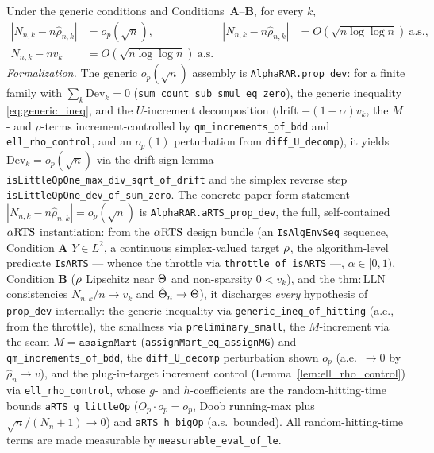 \begin{lemma}\label{lem:prop_dev}
\leanok
{}
Under the generic conditions and Conditions~\textbf{A}--\textbf{B}, for every $k$,
\begin{align*}
  |N_{n,k} - n\hat{\rho}_{n,k}| &= o_p(\sqrt n), &
  |N_{n,k} - n\hat{\rho}_{n,k}| &= O(\sqrt{n\log\log n})\ \text{a.s.}, \\
  N_{n,k} - n v_k &= O(\sqrt{n\log\log n})\ \text{a.s.}
\end{align*}
\emph{Formalization.} The generic $o_p(\sqrt n)$ assembly is \texttt{AlphaRAR.prop\_dev}: for a finite
family with $\sum_k \mathrm{Dev}_k = 0$ (\texttt{sum\_count\_sub\_smul\_eq\_zero}), the generic
inequality \eqref{eq:generic_ineq}, and the $U$-increment decomposition (drift $-(1-\alpha)v_k$, the
$M$- and $\rho$-terms increment-controlled by \texttt{qm\_increments\_of\_bdd} and
\texttt{ell\_rho\_control}, and an $o_p(1)$ perturbation from \texttt{diff\_U\_decomp}), it yields
$\mathrm{Dev}_k=o_p(\sqrt n)$ via the drift-sign lemma
\texttt{isLittleOpOne\_max\_div\_sqrt\_of\_drift} and the simplex reverse step
\texttt{isLittleOpOne\_dev\_of\_sum\_zero}. The concrete paper-form statement
$|N_{n,k}-n\hat\rho_{n,k}|=o_p(\sqrt n)$ is \texttt{AlphaRAR.aRTS\_prop\_dev}, the full, self-contained
$\alpha\text{RTS}$ instantiation: from the $\alpha\text{RTS}$ design bundle (an \texttt{IsAlgEnvSeq} sequence, Condition
\textbf{A} $Y\in L^2$, a continuous simplex-valued target $\rho$, the algorithm-level predicate
\texttt{IsARTS} --- whence the throttle via \texttt{throttle\_of\_isARTS} ---, $\alpha\in[0,1)$,
Condition \textbf{B} ($\rho$ Lipschitz near $\Theta$ and non-sparsity $0<v_k$), and the
$\mathrm{thm{:}LLN}$ consistencies $N_{n,k}/n\to v_k$ and $\hat{\Theta}_n\to\Theta$), it discharges
\emph{every} hypothesis of \texttt{prop\_dev} internally: the generic inequality via
\texttt{generic\_ineq\_of\_hitting} (a.e., from the throttle), the smallness via
\texttt{preliminary\_small}, the $M$-increment via the seam $M=\texttt{assignMart}$
(\texttt{assignMart\_eq\_assignMG}) and \texttt{qm\_increments\_of\_bdd}, the \texttt{diff\_U\_decomp}
perturbation shown $o_p$ (a.e.\ $\to0$ by $\hat\rho_n\to v$), and the plug-in-target increment control
(Lemma~\ref{lem:ell_rho_control}) via \texttt{ell\_rho\_control}, whose $g$- and $h$-coefficients are
the random-hitting-time bounds \texttt{aRTS\_g\_littleOp} ($O_p\cdot o_p=o_p$, Doob running-max plus
$\sqrt n/(N_n+1)\to0$) and \texttt{aRTS\_h\_bigOp} (a.s.\ bounded). All random-hitting-time terms are
made measurable by \texttt{measurable\_eval\_of\_le}.


\end{lemma}
